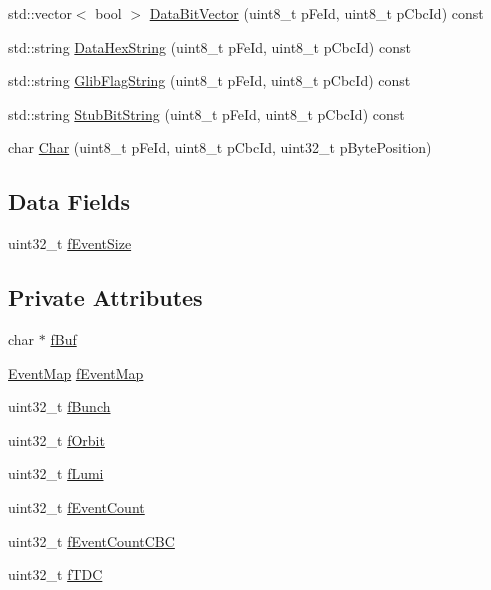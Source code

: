\begin{DoxyCompactItemize}
\item 
std\-::vector$<$ bool $>$ \hyperlink{class_ph2___hw_interface_1_1_event_a54db44c9de8f4ca816d8cadcaa733260}{Data\-Bit\-Vector} (uint8\-\_\-t p\-Fe\-Id, uint8\-\_\-t p\-Cbc\-Id) const 
\item 
std\-::string \hyperlink{class_ph2___hw_interface_1_1_event_ab7a41db929dba07f724a0b0f3e5ba626}{Data\-Hex\-String} (uint8\-\_\-t p\-Fe\-Id, uint8\-\_\-t p\-Cbc\-Id) const 
\item 
std\-::string \hyperlink{class_ph2___hw_interface_1_1_event_a8b6a50a409927366a830084f11885882}{Glib\-Flag\-String} (uint8\-\_\-t p\-Fe\-Id, uint8\-\_\-t p\-Cbc\-Id) const 
\item 
std\-::string \hyperlink{class_ph2___hw_interface_1_1_event_abc647a9563bd796f8785590a2b5b525b}{Stub\-Bit\-String} (uint8\-\_\-t p\-Fe\-Id, uint8\-\_\-t p\-Cbc\-Id) const 
\item 
char \hyperlink{class_ph2___hw_interface_1_1_event_a348abea85bdfdfc8c0b88cda907dbea8}{Char} (uint8\-\_\-t p\-Fe\-Id, uint8\-\_\-t p\-Cbc\-Id, uint32\-\_\-t p\-Byte\-Position)
\end{DoxyCompactItemize}
\subsection*{Data Fields}
\begin{DoxyCompactItemize}
\item 
uint32\-\_\-t \hyperlink{class_ph2___hw_interface_1_1_event_a0a12db10e67652851517cc65c8057667}{f\-Event\-Size}
\end{DoxyCompactItemize}
\subsection*{Private Attributes}
\begin{DoxyCompactItemize}
\item 
char $\ast$ \hyperlink{class_ph2___hw_interface_1_1_event_ab396cf1480f11b535d0e464aa6f9f046}{f\-Buf}
\item 
\hyperlink{namespace_ph2___hw_interface_acf9f41d647e7a3ad9bae233b04b9e3bc}{Event\-Map} \hyperlink{class_ph2___hw_interface_1_1_event_ace9844f1fc14895f880ed111c705d392}{f\-Event\-Map}
\item 
uint32\-\_\-t \hyperlink{class_ph2___hw_interface_1_1_event_ae5b69f2e0a9c9c947f7a37b7dcf380dc}{f\-Bunch}
\item 
uint32\-\_\-t \hyperlink{class_ph2___hw_interface_1_1_event_a6aa6c402d2b16e735fbb4b7518c2666e}{f\-Orbit}
\item 
uint32\-\_\-t \hyperlink{class_ph2___hw_interface_1_1_event_a78afd0886560acf70ee6b982c5690e0a}{f\-Lumi}
\item 
uint32\-\_\-t \hyperlink{class_ph2___hw_interface_1_1_event_add8f3a445ae11e54b47af7690074a4ce}{f\-Event\-Count}
\item 
uint32\-\_\-t \hyperlink{class_ph2___hw_interface_1_1_event_ac61b0e2c53e5d4228d43132f470dfdac}{f\-Event\-Count\-C\-B\-C}
\item 
uint32\-\_\-t \hyperlink{class_ph2___hw_interface_1_1_event_ab91638311238d12f1cd258556c8d1d80}{f\-T\-D\-C}
\end{DoxyCompactItemize}


